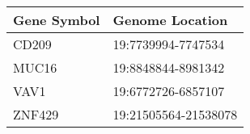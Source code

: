 \begin{tabular}{ll}
\toprule
Gene Symbol &      Genome Location \\
\midrule
      CD209 &   19:7739994-7747534 \\
      MUC16 &   19:8848844-8981342 \\
       VAV1 &   19:6772726-6857107 \\
     ZNF429 & 19:21505564-21538078 \\
\bottomrule
\end{tabular}
